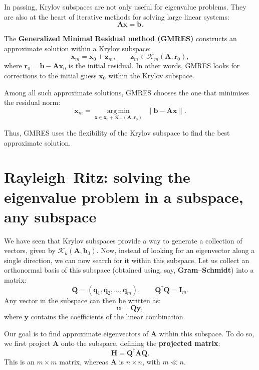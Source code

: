 \documentclass[10pt,aspectratio=169]{beamer}
\begin{document}
\begin{frame}
	In passing, Krylov subspaces are not only useful for eigenvalue problems. 
	They are also at the heart of iterative methods for solving large linear systems:
	\begin{equation*}
		\mathbf A\mathbf x=\mathbf b.
	\end{equation*}
	
	The \textbf{Generalized Minimal Residual method (GMRES)} constructs an approximate solution within a Krylov subspace:
	\begin{equation*}
		\mathbf x_m=\mathbf x_0+\mathbf z_m,\qquad \mathbf z_m\in\mathcal K_m(\mathbf A,\mathbf r_0),
	\end{equation*}
	where $\mathbf r_0=\mathbf b-\mathbf A\mathbf x_0$ is the initial residual. In other words, GMRES looks for corrections to the initial guess $\mathbf x_0$ within the Krylov subspace.
	
	\medskip
	Among all such approximate solutions, GMRES chooses the one that minimises the residual norm:
	\begin{equation*}
		\boxed{\mathbf x_m=\underset{\mathbf x\in\mathbf x_0+\mathcal K_m(\mathbf A,\mathbf r_0)}{\operatorname{arg\,min}}\;\|\mathbf b-\mathbf A\mathbf x\|.}
	\end{equation*}
	
	\medskip
	Thus, GMRES uses the flexibility of the Krylov subspace to find the best approximate solution.
\end{frame}

\section{Rayleigh--Ritz: solving the eigenvalue problem in a subspace, any subspace}

\begin{frame}
	We have seen that Krylov subspaces provide a way to generate a collection of vectors, given by $\mathcal K_k(\mathbf A,\mathbf b_0)$. 
	Now, instead of looking for an eigenvector along a single direction, we can now search for it within this subspace.
	Let us collect an orthonormal basis of this subspace (obtained using, say, \textbf{Gram--Schmidt}) into a matrix:
	\begin{equation*}
		\mathbf Q=(\mathbf q_1,\mathbf q_2,\ldots,\mathbf q_m),\qquad \mathbf Q^\dagger\mathbf Q=\mathbf I_m.
	\end{equation*}
	Any vector in the subspace can then be written as:
	\begin{equation*}
		\mathbf u=\mathbf Q\mathbf y,
	\end{equation*}
	where $\mathbf y$ contains the coefficients of the linear combination.
	
	\pause
	\medskip
	Our goal is to find approximate eigenvectors of $\mathbf A$ within this subspace. To do so, we first project $\mathbf A$ onto the subspace, defining the \textbf{projected matrix}:
	\begin{equation*}
		\boxed{\mathbf H=\mathbf Q^\dagger\mathbf A\mathbf Q.}
	\end{equation*}
	This is an $m\times m$ matrix, whereas $\mathbf A$ is $n\times n$, with $m\ll n$.
\end{frame}
\end{document}
